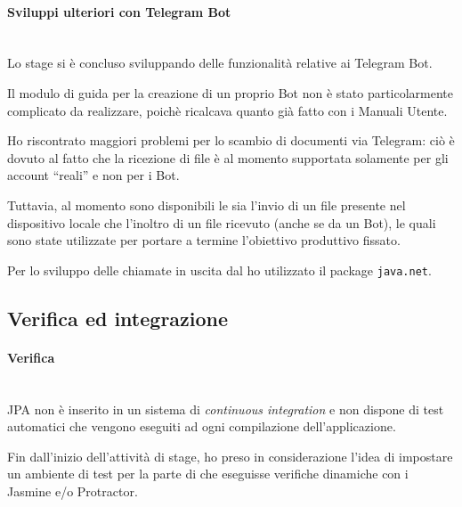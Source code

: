 \paragraph{Sviluppi ulteriori con Telegram Bot} \mbox{} \\

Lo stage si è concluso sviluppando delle funzionalità relative ai Telegram Bot.

Il modulo di guida per la creazione di un proprio Bot non è stato
particolarmente complicato da realizzare, poichè ricalcava quanto già fatto
con i Manuali Utente.

Ho riscontrato maggiori problemi per lo scambio di documenti via Telegram: ciò
è dovuto al fatto che la ricezione di file è al momento supportata solamente
per gli account ``reali'' e non per i Bot.

Tuttavia, al momento sono disponibili le  sia l'invio di un file
presente nel dispositivo locale che l'inoltro di un file ricevuto (anche se da
un Bot), le quali sono state utilizzate per portare a termine l'obiettivo
produttivo fissato.

Per lo sviluppo delle chiamate  in uscita dal \BKEND{} ho
utilizzato il package \texttt{java.net}.


\subsection{Verifica ed integrazione}\label{sec:prog-verifica}

\paragraph{Verifica} \mbox{} \\

JPA non è inserito in un sistema di \emph{continuous integration} e non dispone
di test automatici che vengono eseguiti ad ogni compilazione dell'applicazione.

Fin dall'inizio dell'attività di stage, ho preso in considerazione l'idea di
impostare un ambiente di test per la parte di \FREND{} che eseguisse verifiche
dinamiche con i  Jasmine e/o Protractor.

